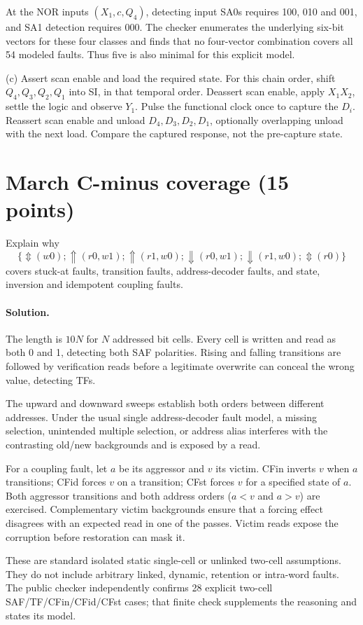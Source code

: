 \documentclass[11pt,a4paper]{article}
\newcommand{\sol}{\paragraph{Solution.}}
\newcommand{\up}{\Uparrow}\newcommand{\dn}{\Downarrow}\newcommand{\any}{\Updownarrow}
\newcommand{\march}{\{\any(w0);\up(r0,w1);\up(r1,w0);\dn(r0,w1);\dn(r1,w0);\any(r0)\}}
\begin{document}
At the NOR inputs $(X_1,c,Q_4)$, detecting input SA0s requires 100, 010 and 001, and SA1 detection requires 000. The checker enumerates the underlying six-bit vectors for these four classes and finds that no four-vector combination covers all 54 modeled faults. Thus five is also minimal for this explicit model.

(c) Assert scan enable and load the required state. For this chain order, shift $Q_4,Q_3,Q_2,Q_1$ into SI, in that temporal order. Deassert scan enable, apply $X_1X_2$, settle the logic and observe $Y_1$. Pulse the functional clock once to capture the $D_i$. Reassert scan enable and unload $D_4,D_3,D_2,D_1$, optionally overlapping unload with the next load. Compare the captured response, not the pre-capture state.

\section{March C-minus coverage (15 points)}
Explain why
\[
 \march
\]
covers stuck-at faults, transition faults, address-decoder faults, and state, inversion and idempotent coupling faults.

\sol The length is $10N$ for $N$ addressed bit cells. Every cell is written and read as both 0 and 1, detecting both SAF polarities. Rising and falling transitions are followed by verification reads before a legitimate overwrite can conceal the wrong value, detecting TFs.

The upward and downward sweeps establish both orders between different addresses. Under the usual single address-decoder fault model, a missing selection, unintended multiple selection, or address alias interferes with the contrasting old/new backgrounds and is exposed by a read.

For a coupling fault, let $a$ be its aggressor and $v$ its victim. CFin inverts $v$ when $a$ transitions; CFid forces $v$ on a transition; CFst forces $v$ for a specified state of $a$. Both aggressor transitions and both address orders ($a<v$ and $a>v$) are exercised. Complementary victim backgrounds ensure that a forcing effect disagrees with an expected read in one of the passes. Victim reads expose the corruption before restoration can mask it.

These are standard isolated static single-cell or unlinked two-cell assumptions. They do not include arbitrary linked, dynamic, retention or intra-word faults. The public checker independently confirms 28 explicit two-cell SAF/TF/CFin/CFid/CFst cases; that finite check supplements the reasoning and states its model.
\end{document}
